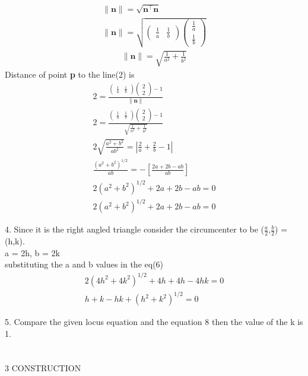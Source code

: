 \documentclass[a4paper,10pt]{report}
\newcommand{\myvec}[1]{\ensuremath{\begin{pmatrix}#1\end{pmatrix}}}
\let\vec\mathbf
\begin{document}
\begin{multicols}{2}
\begin{gather*}
\vec{\|n\|} = \sqrt{\vec{n}^{\top} \vec{n}} \\
\vec{\|n\|} = \sqrt{\myvec{\frac{1}{a}&\frac{1}{b}}\myvec{\frac{1}{a}\\ \frac{1}{b}}}
\end{gather*}
\begin{align}
\vec{\|n\|} = \sqrt{\frac{1}{{a}^{2}} + \frac{1}{{b}^{2}}}
\end{align}
Distance of point \textbf{p} to the line(2) is
\begin{align*}
2 = \frac{\myvec{\frac{1}{a}&\frac{1}{b}}\myvec{2\\2} - 1}{\vec{\|n\|}} \\
2 = \frac{\myvec{\frac{1}{a}&\frac{1}{b}}\myvec{2\\2} - 1}{\sqrt{\frac{1}{{a}^{2}} + \frac{1}{{b}^{2}}}} \\
2{\sqrt{\frac{a^{2} + b^{2}}{{ab}^{2}}}} = | \frac{2}{a} + \frac{2}{b}- 1 | \\
\frac{(a^{2}+b^{2})^{1/2}}{ab} = - [\frac{2a + 2b - ab}{ab}]\\
2(a^{2}+b^{2})^{1/2} + 2a + 2b - ab = 0
\end{align*}
\begin{align}
2(a^{2}+b^{2})^{1/2} + 2a + 2b - ab = 0
\end{align}
\raggedright 4. Since it is the right angled triangle consider the circumcenter to be ($\frac{a}{2}$,$\frac{b}{2}$) = (h,k).\\
a = 2h, b = 2k \\
substituting the a and b values in the eq(6) \\
	\vspace{5mm}
\begin{align}
2(4h^{2}+4k^{2})^{1/2} + 4h + 4h - 4hk = 0 \\
h+k-hk+(h^{2}+k^{2})^{1/2} = 0
\end{align}
	\vspace{5mm}
\raggedright 5. Compare the given locus equation and the equation 8 then the value of the k is 1.\\ 
	\vspace{10mm}
\vspace{2mm}\\
\vspace{2mm}\\
	\vspace{10mm}
	\centering \large\textsc{3  C}\footnotesize\textsc{ONSTRUCTION}\vspace{5mm}\\

\end{multicols}
\end{document}
